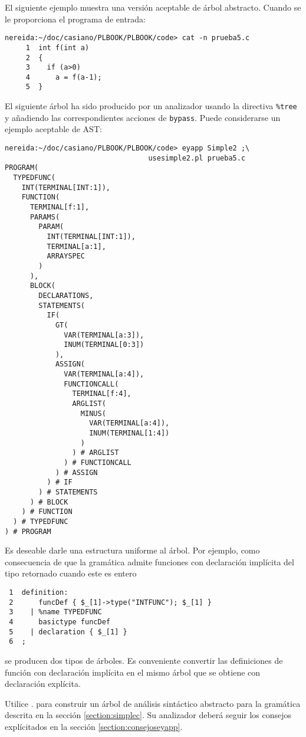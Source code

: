 \begin{enumerate}
El siguiente ejemplo muestra una versión aceptable de árbol abstracto.
Cuando se le proporciona el programa de entrada:

\begin{verbatim}
nereida:~/doc/casiano/PLBOOK/PLBOOK/code> cat -n prueba5.c
     1  int f(int a)
     2  {
     3    if (a>0)
     4      a = f(a-1);
     5  }
\end{verbatim}


El siguiente árbol ha sido producido por un analizador usando la directiva 
\verb|%tree| y añadiendo las correspondientes acciones de \verb|bypass|.
Puede considerarse un ejemplo aceptable de AST:

\begin{verbatim}
nereida:~/doc/casiano/PLBOOK/PLBOOK/code> eyapp Simple2 ;\
                                  usesimple2.pl prueba5.c
PROGRAM(
  TYPEDFUNC(
    INT(TERMINAL[INT:1]),
    FUNCTION(
      TERMINAL[f:1],
      PARAMS(
        PARAM(
          INT(TERMINAL[INT:1]),
          TERMINAL[a:1],
          ARRAYSPEC
        )
      ),
      BLOCK(
        DECLARATIONS,
        STATEMENTS(
          IF(
            GT(
              VAR(TERMINAL[a:3]),
              INUM(TERMINAL[0:3])
            ),
            ASSIGN(
              VAR(TERMINAL[a:4]),
              FUNCTIONCALL(
                TERMINAL[f:4],
                ARGLIST(
                  MINUS(
                    VAR(TERMINAL[a:4]),
                    INUM(TERMINAL[1:4])
                  )
                ) # ARGLIST
              ) # FUNCTIONCALL
            ) # ASSIGN
          ) # IF
        ) # STATEMENTS
      ) # BLOCK
    ) # FUNCTION
  ) # TYPEDFUNC
) # PROGRAM
\end{verbatim}

Es deseable  darle una estructura uniforme al árbol. Por ejemplo, como consecuencia 
de que la gramática admite funciones con declaración implícita del tipo
retornado cuando este es entero

\begin{verbatim}
 1  definition:
 2      funcDef { $_[1]->type("INTFUNC"); $_[1] }
 3    | %name TYPEDFUNC
 4      basictype funcDef
 5    | declaration { $_[1] }
 6  ;
\end{verbatim}
\end{enumerate}

se producen dos tipos de árboles. Es conveniente
convertir las definiciones de función con declaración 
implícita en el mismo árbol que se obtiene con 
declaración explícita. 

\label{practica:esquemadetradsimple}
Utilice 
.
para construir un árbol de análisis sintáctico abstracto 
para la gramática descrita en la sección
\ref{section:simplec}.
Su analizador deberá seguir los consejos explícitados en la 
sección \ref{section:consejoseyapp}.

